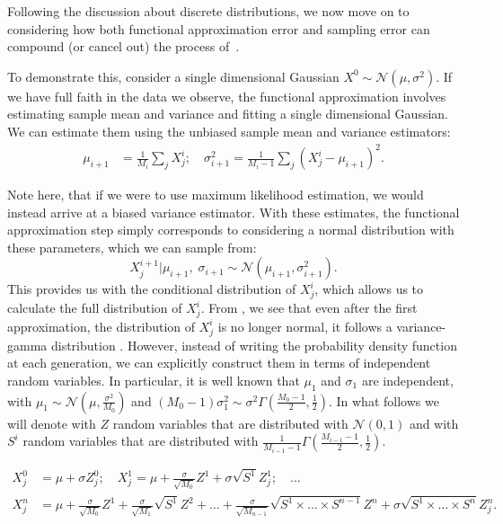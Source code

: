 Following the discussion about discrete distributions, we now move on to considering how both functional approximation error and sampling error can compound (or cancel out) the process of~\md. 

To demonstrate this, consider a single dimensional Gaussian $X^0 \sim \mathcal{N}(\mu,\sigma^2)$. If we have full faith in the data we observe, the functional approximation involves estimating sample mean and variance and fitting a single dimensional Gaussian. We can estimate them using the unbiased sample mean and variance estimators:
\begin{align}
\label{eq:estimates_gaussian}
    \mu_{i+1} &= \frac{1}{M_i}\sum_j X^i_j; \quad \sigma_{i+1}^2 = \frac{1}{M_i-1}\sum _j(X^i_j-\mu_{i+1})^2.
\end{align}


Note here, that if we were to use maximum likelihood estimation, we would instead arrive at a biased variance estimator. With these estimates, the functional approximation step simply corresponds to considering a normal distribution with these parameters, which we can sample from: 
\begin{equation}
X^{i+1}_j|\mu_{i+1},\;\sigma_{i+1}\sim \mathcal{N}(\mu_{i+1},\sigma_{i+1}^2).
\end{equation}
This provides us with the conditional distribution of $X^i_j$, which allows us to calculate the full distribution of $X^i_j$. From , we see that even after the first approximation, the distribution of $X^i_j$ is no longer normal, it follows a variance-gamma distribution \citep{fischer2023variancegamma}. However, instead of writing the probability density function at each generation, we can explicitly construct them in terms of independent random variables. In particular, it is well known \citep{cochran_1934} that $\mu_1$ and $\sigma_1$ are independent, with $\mu_1 \sim \mathcal{N}(\mu, \frac{\sigma^2}{M_0})$ and $(M_0-1)\sigma_1^2 \sim \sigma^2\Gamma(\frac{M_0-1}{2}, \frac12)$. In what follows we will denote with $Z$ random variables that are distributed with $\mathcal{N}(0, 1)$ and with $S^i$ random variables that are distributed with $\frac{1}{M_{i-1}-1}\Gamma(\frac{M_{i-1}-1}{2}, \frac12)$. 

\begin{align}
\label{eq:stochproc}
    X^0_j &= \mu + \sigma Z^0_j; \quad X^1_j = \mu + \frac{\sigma}{\sqrt{M_0}}Z^1 + \sigma\sqrt{S^1}Z^1_j; \quad \dots\\
    \nonumber X^n_j &= \mu + \frac{\sigma}{\sqrt{M_0}}Z^1 + \frac{\sigma}{\sqrt{M_1}}\sqrt{S^1}Z^2 + \dots + \frac{\sigma}{\sqrt{M_{n-1}}}\sqrt{S^1\times\dots\times S^{n-1}}Z^n+\sigma\sqrt{S^1\times\dots\times S^{n}}Z^n_j.
\end{align}

